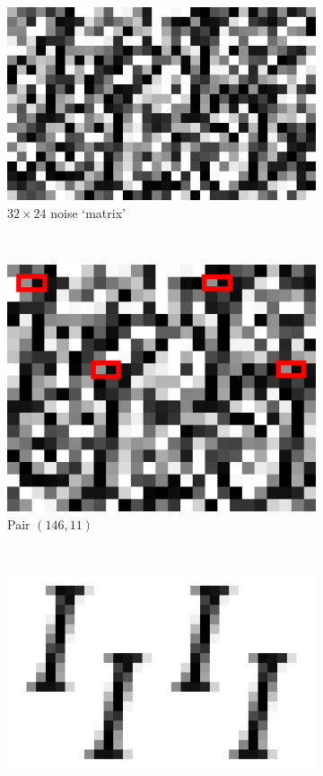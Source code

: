 \documentclass{llncs}
\begin{document}
\begin{figure}[b]
\centering
\begin{subfigure}[t]{0.35\textwidth}
\centering
\includegraphics[scale=.25]{img/Garamond-I_cropped.png}
\caption{$32\times 24$ noise `matrix'}
\label{fig-example1a}
\end{subfigure}%
~
\begin{subfigure}[t]{0.20\textwidth}
\centering
\includegraphics[scale=.25]{img/Garamond-I-highlight_cropped.png}
\caption{Pair $(146,11)$}
\label{fig-example1b}
\end{subfigure}%
~
\begin{subfigure}[t]{0.37\textwidth}
\centering
\includegraphics[scale=.25]{img/Garamond-I-clean_cropped.png}

\end{subfigure}
\end{figure}
\end{document}
